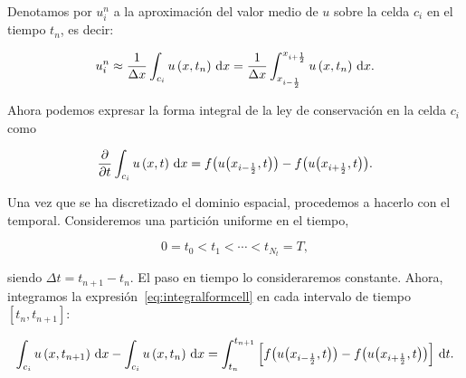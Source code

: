 \begin{frame}
    \frametitle{\secname}

    Denotamos por $u^{n}_{i}$ a la aproximación del
    valor medio de $u$ sobre la celda $c_{i}$ en el tiempo $t_{n}$, es
    decir:

    \begin{equation*}
        u^{n}_{i}\approx
        \frac{1}{\Delta x}
        \int_{c_{i}}
        u
        \left(x,t_{n}\right)
        \dl x=
        \frac{1}{\Delta x}
        \int_{x_{i-\frac{1}{2}}}^{x_{i+\frac{1}{2}}}
        u
        \left(x,t_{n}\right)
        \dl x.
    \end{equation*}

    Ahora podemos expresar la forma integral de la ley de conservación en
    la celda $c_{i}$ como

    \begin{equation}\label{eq:integralformcell}
        \diffp{}{t}
        \int_{c_{i}}
        u\left(x,t\right)
        \dl x=
        f
        \big(
        u\big(x_{i-\frac{1}{2}},t\big)
        \big)-
        f
        \big(
        u\big(x_{i+\frac{1}{2}},t\big)
        \big).
    \end{equation}

    Una vez que se ha discretizado el dominio espacial, procedemos a
    hacerlo con el temporal.
    Consideremos una partición uniforme en el tiempo,

    \begin{equation*}
        0=
        t_{0}<
        t_{1}<
        \cdots<
        t_{N_{t}}=
        T,
    \end{equation*}

    siendo $\Delta t=t_{n+1}-t_{n}$.
    El paso en tiempo lo consideraremos constante.
    Ahora, integramos la expresión~\eqref{eq:integralformcell} en cada
    intervalo de tiempo $\left[t_{n},t_{n+1}\right]$:

    \begin{equation}\label{eq:integrationeachinterval}
        \int_{c_{i}}
        u
        \left(x,t_{n+1}\right)
        \dl x-
        \int_{c_{i}}
        u
        \left(x,t_{n}\right)
        \dl x=
        \int_{t_{n}}^{t_{n+1}}
        \left[
            f
            \big(
            u\big(x_{i-\frac{1}{2}},t\big)
            \big)-
            f
            \big(
            u\big(x_{i+\frac{1}{2}},t\big)
            \big)
            \right]
        \dl t.
    \end{equation}
\end{frame}

